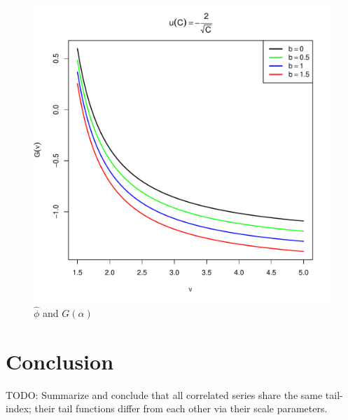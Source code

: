 \documentclass[11pt,a4]{amsart}
\newcommand{\1}{{\mathbf 1}}
\begin{document}
\begin{figure}[htb!]
\begin{minipage}{0.5\linewidth}
  \end{minipage}\hfill
  \begin{minipage}{0.5\linewidth}
    \includegraphics[width=\textwidth]{U_b_t_power.pdf}
  \end{minipage}
  \caption{$\hat\phi$ and $G(\alpha)$
    \label{fig:phi_hat_U}
  }
\end{figure}

\section{Conclusion}
\label{sec:4}
TODO: Summarize and conclude that all correlated series share the same
tail-index; their tail functions differ from each other via their
scale parameters.

\appendix
\end{document}
